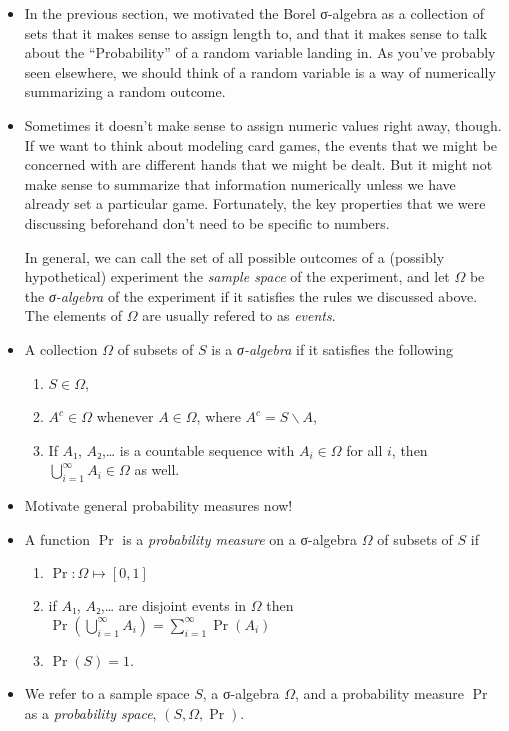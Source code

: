 \begin{itemize}

\item In the previous section, we motivated the Borel σ-algebra as a
  collection of sets that it makes sense to assign length to, and that
  it makes sense to talk about the ``Probability'' of a random
  variable landing in.  As you've probably seen elsewhere, we should
  think of a random variable is a way of numerically summarizing a
  random outcome.

\item Sometimes it doesn't make sense to assign numeric values right
  away, though.  If we want to think about modeling card games, the
  events that we might be concerned with are different hands that we
  might be dealt.  But it might not make sense to summarize that
  information numerically unless we have already set a particular
  game.  Fortunately, the key properties that we were discussing
  beforehand don't need to be specific to numbers.

  In general, we can call the set of all possible outcomes of a
  (possibly hypothetical) experiment the \emph{sample space} of the
  experiment, and let $Ω$ be the \emph{σ-algebra} of the experiment if
  it satisfies the rules we discussed above.  The elements of $Ω$ are
  usually refered to as \emph{events}.

\item %
  \begin{defn} A collection $Ω$ of subsets of $S$ is a
    \emph{σ-algebra} if it satisfies the following
    \begin{enumerate}
    \item $S ∈ Ω$,
    \item $A^c ∈ Ω$ whenever $A ∈ Ω$, where $A^c = S ∖ A$,
    \item If $A₁$, $A₂$,… is a countable sequence with $A_i ∈ Ω$ for
      all $i$, then $⋃_{i=1}^∞ A_i ∈ Ω$ as well.
    \end{enumerate}
  \end{defn}

\item Motivate general probability measures now!

\item %
  \begin{defn} A function $\Pr$ is a \emph{probability measure} on a
    σ-algebra $Ω$ of subsets of $S$ if
    \begin{enumerate}
    \item $\Pr: Ω ↦ [0,1]$
    \item if $A₁$, $A₂$,… are disjoint events in $Ω$ then
      $\Pr(⋃_{i=1}^∞ A_i) = ∑_{i=1}^∞ \Pr(A_i)$
    \item $\Pr(S) = 1$.
    \end{enumerate}
  \end{defn}
  
\item We refer to a sample space $S$, a σ-algebra $Ω$, and a
  probability measure $\Pr$ as a \emph{probability space}, $(S, Ω,
  \Pr)$.

\end{itemize}


